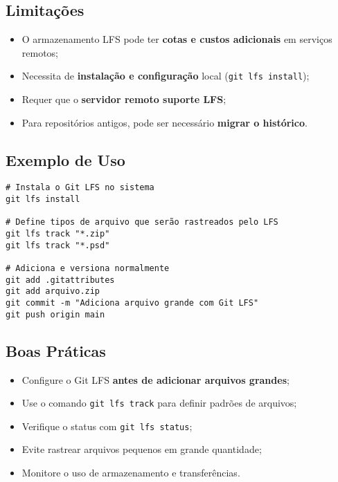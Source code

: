 \subsection{Limitações}

\begin{itemize}
  \item O armazenamento LFS pode ter \textbf{cotas e custos adicionais} em serviços remotos;
  \item Necessita de \textbf{instalação e configuração} local (\texttt{git lfs install});
  \item Requer que o \textbf{servidor remoto suporte LFS};
  \item Para repositórios antigos, pode ser necessário \textbf{migrar o histórico}.
\end{itemize}

\subsection{Exemplo de Uso}

\begin{verbatim}
# Instala o Git LFS no sistema
git lfs install

# Define tipos de arquivo que serão rastreados pelo LFS
git lfs track "*.zip"
git lfs track "*.psd"

# Adiciona e versiona normalmente
git add .gitattributes
git add arquivo.zip
git commit -m "Adiciona arquivo grande com Git LFS"
git push origin main
\end{verbatim}

\subsection{Boas Práticas}

\begin{itemize}
  \item Configure o Git LFS \textbf{antes de adicionar arquivos grandes};
  \item Use o comando \texttt{git lfs track} para definir padrões de arquivos;
  \item Verifique o status com \texttt{git lfs status};
  \item Evite rastrear arquivos pequenos em grande quantidade;
  \item Monitore o uso de armazenamento e transferências.
\end{itemize}